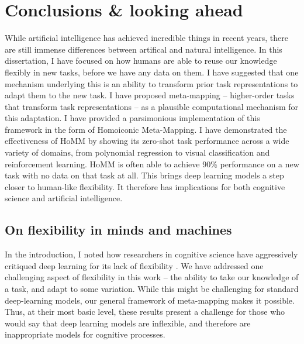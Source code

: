 \chapter{Conclusions \& looking ahead} \label{chapter:conclusions}

While artificial intelligence has achieved incredible things in recent years, there are still immense differences between artifical and natural intelligence. In this dissertation, I have focused on how humans are able to reuse our knowledge flexibly in new tasks, before we have any data on them. I have suggested that one mechanism underlying this is an ability to transform prior task representations to adapt them to the new task. I have proposed meta-mapping -- higher-order tasks that transform task representations -- as a plausible computational mechanism for this adaptation. I have provided a parsimonious implementation of this framework in the form of Homoiconic Meta-Mapping. I have demonstrated the effectiveness of HoMM by showing its zero-shot task performance across a wide variety of domains, from polynomial regression to visual classification and reinforcement learning. HoMM is often able to achieve 90\% performance on a new task with no data on that task at all. This brings deep learning models a step closer to human-like flexibility. It therefore has implications for both cognitive science and artificial intelligence. \par  

\section{On flexibility in minds and machines}

In the introduction, I noted how researchers in cognitive science have aggressively critiqued deep learning for its lack of flexibility \citep[e.g.][]{Lake2015, Lake2016, Lake2017, Marcus2018}. We have addressed one challenging aspect of flexibility in this work -- the ability to take our knowledge of a task, and adapt to some variation. While this might be challenging for standard deep-learning models, our general framework of meta-mapping makes it possible. Thus, at their most basic level, these results present a challenge for those who would say that deep learning models are inflexible, and therefore are inappropriate models for cognitive processes. \par  

